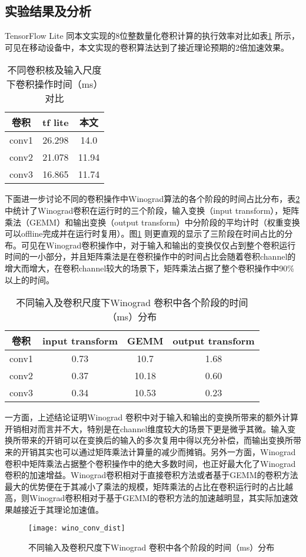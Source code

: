 \subsection{实验结果及分析}

TensorFlow Lite 同本文实现的8位整数量化卷积计算的执行效率对比如表\ref{tbl:eff_tbl} 所示，可见在移动设备中，本文实现的卷积算法达到了接近理论预期的2倍加速效果。

\begin{table}[]
\centering
\caption{不同卷积核及输入尺度下卷积操作时间（ms）对比}
\begin{tabular}{ccc}
\toprule
卷积 & tf lite & 本文  \\
\midrule
conv1  & 26.298  & 14.0  \\
conv2  & 21.078  & 11.94 \\
conv3  & 16.865  & 11.74 \\
\bottomrule
\end{tabular}
\label{tbl:eff_tbl}
\end{table}

下面进一步讨论不同的卷积操作中Winograd算法的各个阶段的时间占比分布，表\ref{tbl:eff_dist} 中统计了Winograd卷积在运行时的三个阶段，输入变换（input transform），矩阵乘法（GEMM）和输出变换（output transform）中分阶段的平均计时（权重变换可以offline完成并在运行时复用）。图\ref{fig:wino_conv_dist} 则更直观的显示了三阶段在时间占比的分布。可见在Winograd卷积操作中，对于输入和输出的变换仅仅占到整个卷积运行时间的一小部分，并且矩阵乘法是在卷积操作中的时间占比会随着卷积channel的增大而增大，在卷积channel较大的场景下，矩阵乘法占据了整个卷积操作中90\% 以上的时间。


\begin{table}[]
\centering
\caption{不同输入及卷积尺度下Winograd 卷积中各个阶段的时间（ms）分布}
\begin{tabular}{cccc}
\toprule
卷积  & input transform           & GEMM                       & output transform \\
\midrule
conv1  & 0.73                      & 10.7                       & 1.68             \\
conv2  & 0.37                      & 10.18                      & 0.60             \\ 
conv3  & 0.34                      & 10.53                      & 0.23             \\
\bottomrule
\end{tabular}
\label{tbl:eff_dist}
\end{table}
一方面，上述结论证明Winograd 卷积中对于输入和输出的变换所带来的额外计算开销相对而言并不大，特别是在channel维度较大的场景下更是微乎其微。输入变换所带来的开销可以在变换后的输入的多次复用中得以充分补偿，而输出变换所带来的开销其实也可以通过矩阵乘法计算量的减少而摊销。另外一方面，Winograd卷积中矩阵乘法占据整个卷积操作中的绝大多数时间，也正好最大化了Winograd卷积的加速增益。Winograd卷积相对于直接卷积方法或者基于GEMM的卷积方法最大的优势便在于其减小了乘法的规模，矩阵乘法的占比在卷积运行时的占比越高，则Winograd卷积相对于基于GEMM的卷积方法的加速越明显，其实际加速效果越接近于其理论加速值。

\begin{figure}
\centering
\texttt{[image: wino\_conv\_dist]}
\caption{不同输入及卷积尺度下Winograd 卷积中各个阶段的时间（ms）分布}
\label{fig:wino_conv_dist}
\end{figure}


